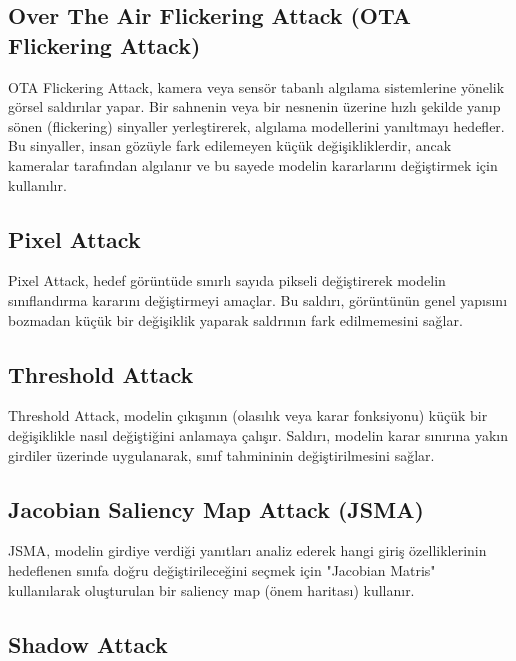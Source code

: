 \newpage

\subsection{Over The Air Flickering Attack (OTA Flickering Attack)}

OTA Flickering Attack, kamera veya sensör tabanlı algılama sistemlerine yönelik görsel saldırılar yapar. Bir sahnenin veya bir nesnenin üzerine hızlı şekilde yanıp sönen (flickering) sinyaller yerleştirerek, algılama modellerini yanıltmayı hedefler. Bu sinyaller, insan gözüyle fark edilemeyen küçük değişikliklerdir, ancak kameralar tarafından algılanır ve bu sayede modelin kararlarını değiştirmek için kullanılır.

\newpage

\subsection{Pixel Attack}

Pixel Attack, hedef görüntüde sınırlı sayıda pikseli değiştirerek modelin sınıflandırma kararını değiştirmeyi amaçlar. Bu saldırı, görüntünün genel yapısını bozmadan küçük bir değişiklik yaparak saldrının fark edilmemesini sağlar.

\newpage

\subsection{Threshold Attack}

Threshold Attack, modelin çıkışının (olasılık veya karar fonksiyonu) küçük bir değişiklikle nasıl değiştiğini anlamaya çalışır. Saldırı, modelin karar sınırına yakın girdiler üzerinde uygulanarak, sınıf tahmininin değiştirilmesini sağlar.

\newpage

\subsection{Jacobian Saliency Map Attack (JSMA)} 

JSMA, modelin girdiye verdiği yanıtları analiz ederek hangi giriş özelliklerinin hedeflenen sınıfa doğru değiştirileceğini seçmek için "Jacobian Matris" kullanılarak oluşturulan bir saliency map (önem haritası) kullanır. 

\newpage

\subsection{Shadow Attack}

